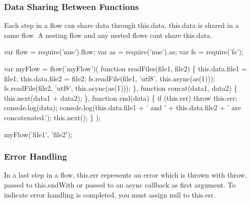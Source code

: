 \subsubsection*{Data Sharing Between Functions}

Each step in a flow can share data through {\ttfamily this.\+data}. {\ttfamily this.\+data} is shared in a same flow. A nesting flow and any nested flows can\textquotesingle{}t share {\ttfamily this.\+data}.


\begin{DoxyCode}
var flow = require(\textcolor{stringliteral}{'nue'}).flow;
var as = require(\textcolor{stringliteral}{'nue'}).as;
var fs = require(\textcolor{stringliteral}{'fs'});

var myFlow = flow(\textcolor{stringliteral}{'myFlow'})(
  \textcolor{keyword}{function} readFiles(file1, file2) \{
    this.data.file1 = file1;
    this.data.file2 = file2;
    fs.readFile(file1, \textcolor{stringliteral}{'utf8'}, this.async(as(1)));
    fs.readFile(file2, \textcolor{stringliteral}{'utf8'}, this.async(as(1)));
  \},
  \textcolor{keyword}{function} concat(data1, data2) \{
    this.next(data1 + data2);
  \},
  \textcolor{keyword}{function} end(data) \{
    \textcolor{keywordflow}{if} (this.err) \textcolor{keywordflow}{throw} this.err;
    console.log(data);
    console.log(this.data.file1 + \textcolor{stringliteral}{' and '} + \textcolor{keyword}{this}.data.file2 + \textcolor{stringliteral}{' are concatenated.'});
    this.next();
  \}
);

myFlow(\textcolor{stringliteral}{'file1'}, \textcolor{stringliteral}{'file2'});
\end{DoxyCode}


\subsubsection*{Error Handling}

In a last step in a flow, {\ttfamily this.\+err} represents an error which is thrown with {\ttfamily throw}, passed to {\ttfamily this.\+end\+With} or passed to an async callback as first argument. To indicate error handling is completed, you must assign {\ttfamily null} to {\ttfamily this.\+err}.


